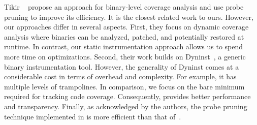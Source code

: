 Tikir \etal~\cite{Tikir2002} propose an approach for binary-level coverage analysis and use probe pruning to improve its efficiency.
It is the closest related work to ours. 
However, our approaches differ in several aspects. 
First, they focus on dynamic coverage analysis where binaries can be analyzed, patched, and potentially restored at runtime.
In contrast, our static instrumentation approach allows us to spend more time on optimizations.
Second, their work builds on Dyninst~\cite{DyninstWeb}, a generic binary instrumentation tool.
However, the generality of Dyninst comes at a considerable cost in terms of overhead and complexity. 
For example, it has multiple levels of trampolines.
In comparison, we focus on the bare minimum required for tracking code coverage. 
Consequently, {\bcov} provides better performance and transparency.
Finally, as acknowledged by the authors, the probe pruning
technique implemented in \bcov{} is more efficient than that of~\cite{Tikir2002}. 

